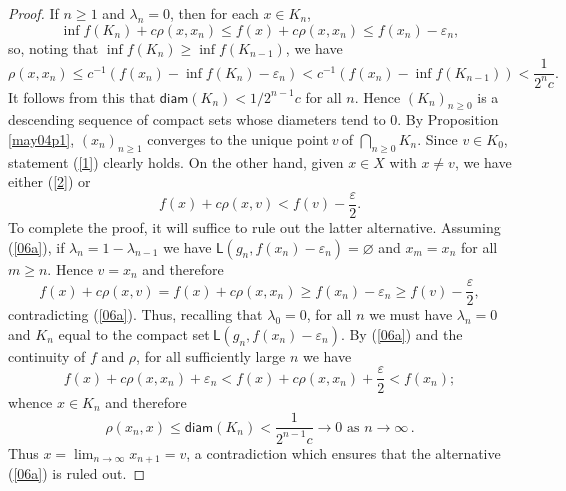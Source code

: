 \documentclass[10pt,a4paper]{amsart}
\begin{document}
\begin{proof}
If $n\geqslant1$ and $\lambda_{n}=0$, then for each $x\in K_{n}$,%
\[
\inf f(K_{n})+c\rho\left(  x,x_{n}\right)  \leqslant f\left(  x\right)
+c\rho\left(  x,x_{n}\right)  \leqslant f\left(  x_{n}\right)  -\varepsilon
_{n},
\]
so, noting that $\inf f(K_{n})\geqslant\inf f(K_{n-1})$, we have
\[
\rho\left(  x,x_{n}\right)  \leqslant c^{-1}(f\left(  x_{n}\right)  -\inf
f(K_{n})-\varepsilon_{n})<c^{-1}(f\left(  x_{n}\right)  -\inf f(K_{n-1}%
))<\frac{1}{2^{n}c}.
\]
It follows from this that $\mathsf{diam}(K_{n})<1/2^{n-1}c$ for all $n$. Hence
$\left(  K_{n}\right)  _{n\geqslant0}$ is a descending sequence of compact
sets whose diameters tend to $0$. By Proposition \ref{may04p1}, $\left(
x_{n}\right)  _{n\geqslant1}$ converges to the unique point$\ v~$of $%
{\textstyle\bigcap_{n\geqslant0}}
K_{n}$. Since $v\in K_{0}$, statement (\ref{1}) clearly holds. On the other
hand, given $x\in X$ with $x\neq v$, we have either (\ref{2}) or%
\begin{equation}
f\left(  x\right)  +c\rho\left(  x,v\right)  <f\left(  v\right)
-\frac{\varepsilon}{2}. \label{06a}%
\end{equation}
To complete the proof, it will suffice to rule out the latter alternative.
Assuming (\ref{06a}), if $\lambda_{n}=1-\lambda_{n-1}$ we have $\mathsf{L}%
(g_{n},f(x_{n})-\varepsilon_{n})=\varnothing$ and $x_{m}=x_{n}$ for all
$m\geqslant n$. Hence $v=x_{n}$ and therefore%
\[
f\left(  x\right)  +c\rho\left(  x,v\right)  =f\left(  x\right)  +c\rho\left(
x,x_{n}\right)  \geqslant f\left(  x_{n}\right)  -\varepsilon_{n}\geqslant
f\left(  v\right)  -\frac{\varepsilon}{2},
\]
contradicting (\ref{06a}). Thus, recalling that $\lambda_{0}=0$, for all $n$
we must have $\lambda_{n}=0$ and $K_{n}$ equal to the compact set$\ \mathsf{L}%
(g_{n},f(x_{n})-\varepsilon_{n})$. By (\ref{06a}) and the continuity of $f $
and $\rho$, for all sufficiently large $n$ we have%
\[
f(x)+c\rho(x,x_{n})+\varepsilon_{n}<f(x)+c\rho(x,x_{n})+\frac{\varepsilon}%
{2}<f(x_{n});
\]
whence $x\in K_{n}$ and therefore%
\[
\rho(x_{n},x)\leqslant\mathsf{diam}(K_{n})<\frac{1}{2^{n-1}c}\rightarrow
0\text{ as }n\rightarrow\infty\,.
\]
Thus $x=\lim_{n\rightarrow\infty}x_{n+1}=v$, a contradiction which ensures
that the alternative (\ref{06a}) is ruled out.
\end{proof}
\end{document}
